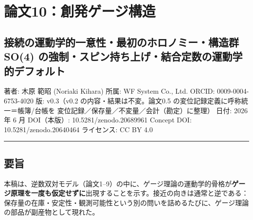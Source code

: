 \documentclass[
]{ltjsarticle}
\author{}
\date{}
\begin{document}
\section{論文10：創発ゲージ構造}\label{ux8ad6ux658710ux5275ux767aux30b2ux30fcux30b8ux69cbux9020}

\subsection{接続の運動学的一意性・最初のホロノミー・構造群 SO(4)
の強制・スピン持ち上げ・結合定数の運動学的デフォルト}\label{ux63a5ux7d9aux306eux904bux52d5ux5b66ux7684ux4e00ux610fux6027ux6700ux521dux306eux30dbux30edux30ceux30dfux30fcux69cbux9020ux7fa4-so4-ux306eux5f37ux5236ux30b9ux30d4ux30f3ux6301ux3061ux4e0aux3052ux7d50ux5408ux5b9aux6570ux306eux904bux52d5ux5b66ux7684ux30c7ux30d5ux30a9ux30ebux30c8}

著者: 木原 範昭 (Noriaki Kihara) 所属: WF System Co., Ltd. ORCID:
0009-0004-6753-4020 版: v0.3（v0.2 の内容・結果は不変。論文0.5
の変位記録定義に呼称統一＝帳簿/台帳を
変位記録／保存量／不変量／会計（勘定）に整理） 日付: 2026 年 6 月
DOI（本版）: 10.5281/zenodo.20689961 Concept DOI:
10.5281/zenodo.20640464 ライセンス: CC BY 4.0

\begin{center}\rule{0.5\linewidth}{0.5pt}\end{center}

\subsection{要旨}\label{ux8981ux65e8}

本稿は、逆数双対モデル（論文1--9）の中に、ゲージ理論の運動学的骨格が\textbf{ゲージ原理を一度も仮定せずに}出現することを示す。接近の向きは通常と逆である：保存量の在庫・安定性・観測可能性という別の問いを詰めるたびに、ゲージ理論の部品が副産物として現れた。
\end{document}
